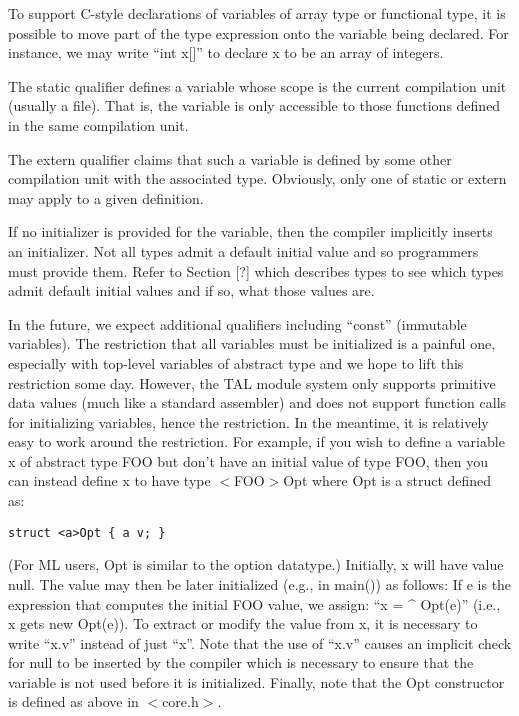 \documentclass[titlepage,10pt]{article}
\begin{document}
To support C-style declarations of variables of array type or functional
type, it is possible to move part of the type expression onto the
variable being declared.  For instance, we may write ``int x[]'' to
declare x to be an array of integers.

The static qualifier defines a variable whose scope is the current
compilation unit (usually a file).  That is, the variable is only
accessible to those functions defined in the same compilation unit.

The extern qualifier claims that such a variable is defined by some
other compilation unit with the associated type.  Obviously, only one of
static or extern may apply to a given definition.

If no initializer is provided for the variable, then the compiler
implicitly inserts an initializer.  Not all types admit a default
initial value and so programmers must provide them.  Refer to Section
[?] which describes types to see which types admit default initial
values and if so, what those values are.

In the future, we expect additional qualifiers including ``const''
(immutable variables).  The restriction that all variables must be
initialized is a painful one, especially with top-level variables of
abstract type and we hope to lift this restriction some day.  However,
the TAL module system only supports primitive data values (much like a
standard assembler) and does not support function calls for initializing
variables, hence the restriction.  In the meantime, it is relatively
easy to work around the restriction.  For example, if you wish to define
a variable x of abstract type FOO but don't have an initial value of
type FOO, then you can instead define x to have type $<$FOO$>$Opt where
Opt is a struct defined as:


\begin{verbatim}
struct <a>Opt { a v; }
\end{verbatim}

(For ML users, Opt is similar to the option datatype.)  Initially, x
will have value null.  The value may then be later initialized (e.g., in
main()) as follows:  If e is the expression that computes the initial
FOO value, we assign:   ``x = \^{} Opt(e)''  (i.e., x gets new Opt(e)).  To
extract or modify the value from x, it is necessary to write ``x.v''
instead of just ``x''.   Note that the use of ``x.v'' causes an implicit
check for null to be inserted by the compiler which is necessary to
ensure that the variable is not used before it is initialized.  Finally,
note that the Opt constructor is defined as above in $<$core.h$>$.
\end{document}
